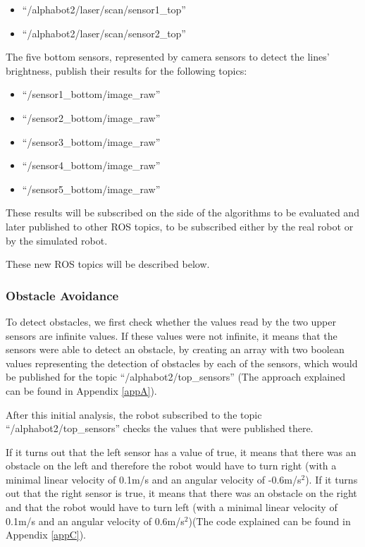 \documentclass[conference]{IEEEtran}
\begin{document}
\begin{itemize}
    \item ``/alphabot2/laser/scan/sensor1\_top''
    \item ``/alphabot2/laser/scan/sensor2\_top''
\end{itemize}

The five bottom sensors, represented by camera sensors to detect the lines' brightness, publish their results for the following topics:

\begin{itemize}
    \item ``/sensor1\_bottom/image\_raw''
    \item ``/sensor2\_bottom/image\_raw''
    \item ``/sensor3\_bottom/image\_raw''
    \item ``/sensor4\_bottom/image\_raw''
    \item ``/sensor5\_bottom/image\_raw''
\end{itemize}

These results will be subscribed on the side of the algorithms to be evaluated and later published to other ROS topics, to be subscribed either by the real robot or by the simulated robot.

These new ROS topics will be described below.

\subsubsection{Obstacle Avoidance} \label{obs}

To detect obstacles, we first check whether the values read by the two upper sensors are infinite values. If these values were not infinite, it means that the sensors were able to detect an obstacle, by creating an array with two boolean values representing the detection of obstacles by each of the sensors, which would be published for the topic ``/alphabot2/top\_sensors'' (The approach explained can be found in Appendix \ref{appA}).

After this initial analysis, the robot subscribed to the topic ``/alphabot2/top\_sensors'' checks the values that were published there.

If it turns out that the left sensor has a value of true, it means that there was an obstacle on the left and therefore the robot would have to turn right (with a minimal linear velocity of 0.1m/s and an angular velocity of -0.6m/s$^{2}$). If it turns out that the right sensor is true, it means that there was an obstacle on the right and that the robot would have to turn left (with a minimal linear velocity of 0.1m/s and an angular velocity of 0.6m/s$^{2}$)(The code explained can be found in Appendix \ref{appC}).
\end{document}
